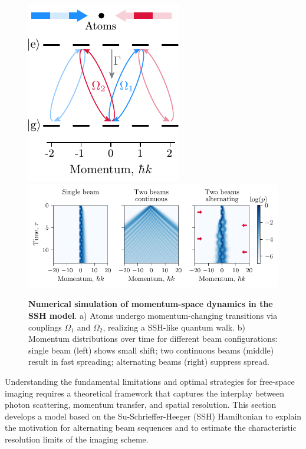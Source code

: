 


\begin{figure}
    \centering
    \includegraphics{fig-ai/ssh-scheme.pdf}
    \hfill
    \includegraphics{fig-py/ssh-model.pdf}
    \caption{
        \textbf{Numerical simulation of momentum-space dynamics in the SSH model}. 
        a) Atoms undergo momentum-changing transitions via couplings $\Omega_1$ and $\Omega_2$, realizing a SSH-like quantum walk.
        b) Momentum distributions over time for different beam configurations: single beam (left) shows small shift; two continuous beams (middle) result in fast spreading; alternating beams (right) suppress spread.
    }
    \label{fig:sshmodel}
\end{figure}


Understanding the fundamental limitations and optimal strategies for free-space imaging requires a theoretical framework that captures the interplay between photon scattering, momentum transfer, and spatial resolution. This section develops a model based on the Su-Schrieffer-Heeger (SSH) Hamiltonian to explain the motivation for alternating beam sequences and to estimate the characteristic resolution limits of the imaging scheme.



